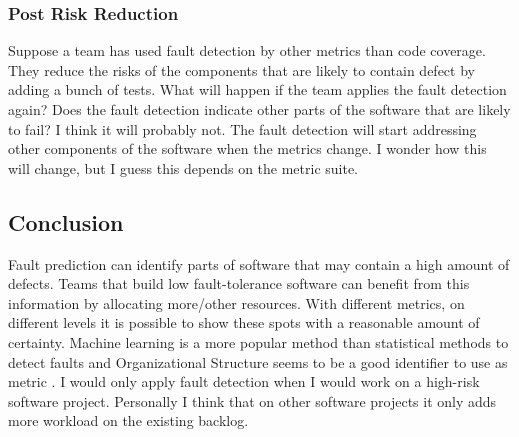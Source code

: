 \subsubsection*{Post Risk Reduction}

Suppose a team has used fault detection by other metrics than code coverage.
They reduce the risks of the components that are likely to contain defect by adding a bunch of tests.
What will happen if the team applies the fault detection again?
Does the fault detection indicate other parts of the software that are likely to fail?
I think it will probably not.
The fault detection will start addressing other components of the software when the metrics change.
I wonder how this will change, but I guess this depends on the metric suite.

\subsection*{Conclusion}

Fault prediction can identify parts of software that may contain a high amount of defects.
Teams that build low fault-tolerance software can benefit from this information by allocating more/other resources.
With different metrics, on different levels it is possible to show these spots with a reasonable amount of certainty.
Machine learning is a more popular method than statistical methods to detect faults \autocite[7347]{Catal20097346} and Organizational Structure seems to be a good identifier to use as metric \autocite{MAKING_SOFTWARE}.
I would only apply fault detection when I would work on a high-risk software project.
Personally I think that on other software projects it only adds more workload on the existing backlog.

